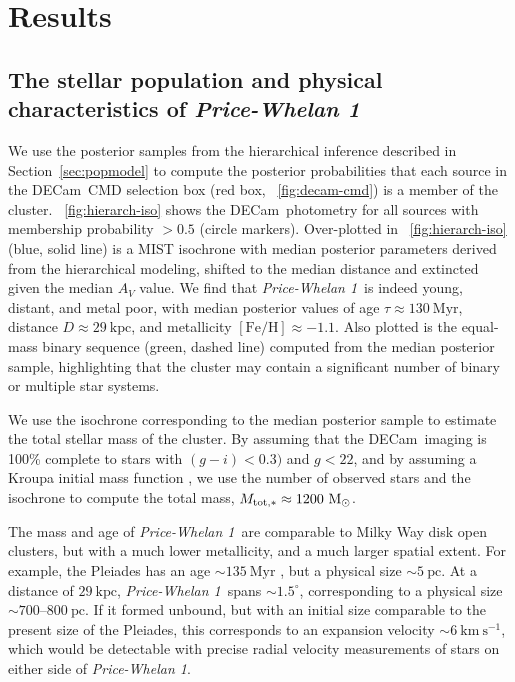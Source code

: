 \documentclass[twocolumn]{aastex62}
\newcommand{\acronym}[1]{{\small{#1}}}
\newcommand{\decam}{DECam}
\newcommand{\sectionname}{Section}
\newcommand{\msun}{\textrm{M}_\odot}
\newcommand{\kms}{\ensuremath{\textrm{km}~\textrm{s}^{-1}}}
\newcommand{\feh}{\ensuremath{[\textrm{Fe} / \textrm{H}]}}
\newcommand{\clustername}{\textsl{Price-Whelan 1}}
\newcommand{\clage}{\ensuremath{130~\textrm{Myr}}}
\newcommand{\clfeh}{\ensuremath{-1.1}}
\newcommand{\cldist}{\ensuremath{29~\textrm{kpc}}}
\begin{document}
\section{Results} \label{sec:results}

\subsection{The stellar population and physical characteristics of \clustername}
\label{sec:popchars}

We use the posterior samples from the hierarchical inference described in \sectionname~\ref{sec:popmodel} to compute the posterior probabilities that each source in the \decam\ CMD selection box (red box, \figurename~\ref{fig:decam-cmd}) is a member of the cluster.
\figurename~\ref{fig:hierarch-iso} shows the \decam\ photometry for all sources with membership probability $> 0.5$ (circle markers).
Over-plotted in \figurename~\ref{fig:hierarch-iso} (blue, solid line) is a \acronym{MIST} isochrone with median posterior parameters derived from the hierarchical modeling, shifted to the median distance and extincted given the median $A_V$ value.
We find that \clustername\ is indeed young, distant, and metal poor, with median posterior values of age $\tau \approx \clage$, distance $D \approx \cldist$, and metallicity $\feh \approx \clfeh$.
Also plotted is the equal-mass binary sequence (green, dashed line) computed from the median posterior sample, highlighting that the cluster may contain a significant number of binary or multiple star systems.

We use the isochrone corresponding to the median posterior sample to estimate the total stellar mass of the cluster.
By assuming that the \decam\ imaging is 100\% complete to stars with $(g-i) < 0.3)$ and $g < 22$, and by assuming a Kroupa initial mass function \citep{Kroupa:TODO}, we use the number of observed stars and the isochrone to compute the total mass, $M_{\rm tot, *} \approx 1200~\msun$.

The mass and age of \clustername\ are comparable to Milky Way disk open clusters, but with a much lower metallicity, and a much larger spatial extent.
For example, the Pleiades has an age $\sim 135~\textrm{Myr}$ \citep{Gossage:2018}, but a physical size $\sim 5~\textrm{pc}$.
At a distance of $\cldist$, \clustername\ spans $\sim 1.5^\circ$, corresponding to a physical size $\sim 700$--$800~\textrm{pc}$.
If it formed unbound, but with an initial size comparable to the present size of the Pleiades, this corresponds to an expansion velocity $\sim 6~\kms$, which would be detectable with precise radial velocity measurements of stars on either side of \clustername.
\end{document}
